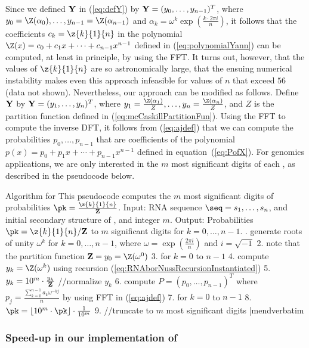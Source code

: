 Since we defined $\bf Y$ in (\ref{eq:defY}) by ${\bf Y} =
(y_0,\ldots,y_{n-1})^T$, where
$y_0=\Z(\alpha_0),\ldots, y_{n-1}=\Z(\alpha_{n-1})$ and $\alpha_k = \omega^k
\exp(\frac{k \cdot 2\pi i}{n})$, it follows that the coefficients
$c_k=\z{k}{1}{n}$ in the polynomial
$\Z(x) = c_0 + c_1 x + \cdots + c_{n-1} x^{n-1}$ defined in
(\ref{eq:polynomialYann}) can be computed, at least in principle,
by using the FFT. It turns out, however, that the values of
$\z{k}{1}{n}$ are so astronomically large, that the ensuing numerical
instability makes even this approach infeasible for values of $n$
that exceed $56$ (data not shown).
Nevertheless, our approach can be modified as follows.
Define $\bf Y$ by ${\bf Y} = (y_1,\ldots,y_n)^T$, where
$y_1=\frac{\Z(\alpha_1)}{Z},\ldots, y_{n}=\frac{\Z(\alpha_{n})}{Z}$, and
$Z$ is the partition function defined in (\ref{eq:mcCaskillPartitionFun}).
Using the FFT to compute the inverse DFT, it follows from
(\ref{eq:ajdef}) that we can compute the probabilities $p_0,\ldots,p_{n-1}$
that are coefficients of the polynomial
$p(x)=p_0+p_1 x + \cdots + p_{n-1}x^{n-1}$
defined in equation~(\ref{eq:PofX}). For genomics applications, we are
only interested in the $m$ most significant digits of each \pk, as described
in the pseudocode below.
\medskip

\noindent
{\sc Algorithm} for \fftbor\hfill\break
This pseudocode computes the $m$ most significant digits
of probabilities $\pk = \frac{\z{k}{1}{n}}{{\bf Z}}$. \hfill\break
{\sc Input:} RNA sequence $\seq=s_1,\ldots,s_n$, and initial secondary
structure \strSt of \seq, and integer $m$. \hfill\break
{\sc Output:} Probabilities $\pk=\z{k}{1}{n}/{\bf Z}$ to $m$ significant digits for $k=0,\ldots,n-1$. \hfill\break
\smallskip
{}.  generate roots of unity $\omega^k$ for $k=0,\ldots,n-1$, where $\omega=\exp(\frac{2 \pi i}{n})$ and $i=\sqrt{-1}$
2.  note that the partition function ${\bf Z}=y_0=\Z(\omega^0)$
3.  for $k=0$ to $n-1$
4.    compute $y_k = \Z(\omega^k)$ using recursion (\ref{eq:RNAborNussRecursionInstantiated})
5.    $y_k = 10^m \cdot \frac{y_k}{{\bf Z}}$ //normalize $y_k$
6.  compute $P = (p_0,\ldots,p_{n-1})^T$ where $p_j =\frac{\sum_{k=0}^{n-1} a_k \omega^{-kj}}{n}$ by using FFT in (\ref{eq:ajdef})
7.  for $k=0$ to $n-1$
8.    $\pk = \lfloor 10^m \cdot \pk \rfloor \cdot \frac{1}{10^m}$
9.    //truncate to $m$ most significant digits
|mendverbatim
\medskip

\subsubsection*{Speed-up in our implementation of \fftbor}

